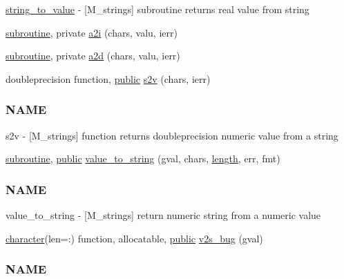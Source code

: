 \begin{DoxyCompactItemize}
\begin{DoxyCompactList}
\hyperlink{interfacem__strings_1_1string__to__value}{string\+\_\+to\+\_\+value} -\/ \mbox{[}M\+\_\+strings\mbox{]} subroutine returns real value from string \end{DoxyCompactList}\item 
\hyperlink{M__stopwatch_83_8txt_acfbcff50169d691ff02d4a123ed70482}{subroutine}, private \hyperlink{namespacem__strings_aca902af295ede82fb0c45174bbfe6eef}{a2i} (chars, valu, ierr)
\item 
\hyperlink{M__stopwatch_83_8txt_acfbcff50169d691ff02d4a123ed70482}{subroutine}, private \hyperlink{namespacem__strings_a751d3101d8404ea10db4d8ba59a75d6b}{a2d} (chars, valu, ierr)
\item 
doubleprecision function, \hyperlink{M__stopwatch_83_8txt_a2f74811300c361e53b430611a7d1769f}{public} \hyperlink{namespacem__strings_a7b153720f1f9b93c49094dcb1272995b}{s2v} (chars, ierr)
\begin{DoxyCompactList}\small\item\em \subsubsection*{N\+A\+ME}

s2v -\/ \mbox{[}M\+\_\+strings\mbox{]} function returns doubleprecision numeric value from a string \end{DoxyCompactList}\item 
\hyperlink{M__stopwatch_83_8txt_acfbcff50169d691ff02d4a123ed70482}{subroutine}, \hyperlink{M__stopwatch_83_8txt_a2f74811300c361e53b430611a7d1769f}{public} \hyperlink{namespacem__strings_a58d30b135c367184a666f8b4baaa64b5}{value\+\_\+to\+\_\+string} (gval, chars, \hyperlink{M__stopwatch_83_8txt_a04ed5ef37abacfa36a856b5f30376485}{length}, err, fmt)
\begin{DoxyCompactList}\small\item\em \subsubsection*{N\+A\+ME}

value\+\_\+to\+\_\+string -\/ \mbox{[}M\+\_\+strings\mbox{]} return numeric string from a numeric value \end{DoxyCompactList}\item 
\hyperlink{option__stopwatch_83_8txt_abd4b21fbbd175834027b5224bfe97e66}{character}(len=\+:) function, allocatable, \hyperlink{M__stopwatch_83_8txt_a2f74811300c361e53b430611a7d1769f}{public} \hyperlink{namespacem__strings_a76a00e3ca7fb7c9b9cadcd484c6e3946}{v2s\+\_\+bug} (gval)
\begin{DoxyCompactList}\small\item\em \subsubsection*{N\+A\+ME}


\end{DoxyCompactList}
\end{DoxyCompactItemize}
